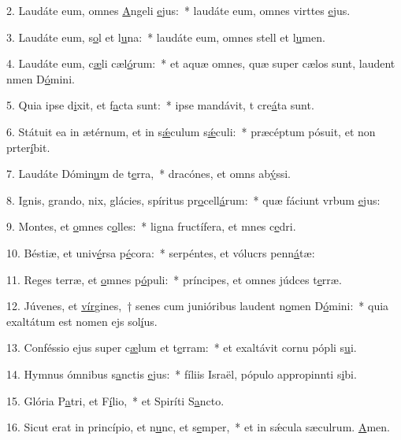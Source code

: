 2. Laudáte eum, omnes \uline{A}ngeli \uline{e}jus:~* laudáte eum, omnes virttes \uline{e}jus.\par 
3. Laudáte eum, s\uline{o}l et l\uline{u}na:~* laudáte eum, omnes stell et l\uline{u}men.\par 
4. Laudáte eum, c\uline{æ}li cæl\uline{ó}rum:~* et aquæ omnes, quæ super cælos sunt, laudent nmen D\uline{ó}mini.\par 
5. Quia ipse d\uline{i}xit, et f\uline{a}cta sunt:~* ipse mandávit, t cre\uline{á}ta sunt.\par 
6. Státuit ea in ætérnum, et in s\uline{ǽ}culum s\uline{ǽ}culi:~* præcéptum pósuit, et non prter\uline{í}bit.\par 
7. Laudáte Dómin\uline{u}m de t\uline{e}rra,~* dracónes, et omns ab\uline{ý}ssi.\par 
8. Ignis, grando, nix, glácies, spíritus pr\uline{o}cell\uline{á}rum:~* quæ fáciunt vrbum \uline{e}jus:\par 
9. Montes, et \uline{o}mnes c\uline{o}lles:~* ligna fructífera, et mnes c\uline{e}dri.\par 
10. Béstiæ, et univ\uline{é}rsa p\uline{é}cora:~* serpéntes, et vólucrs penn\uline{á}tæ:\par 
11. Reges terræ, et \uline{o}mnes p\uline{ó}puli:~* príncipes, et omnes júdces t\uline{e}rræ.\par 
12. Júvenes, et \uline{vír}gines,~† senes cum junióribus laudent n\uline{o}men D\uline{ó}mini:~* quia exaltátum est nomen ejs sol\uline{í}us.\par 
13. Conféssio ejus super c\uline{æ}lum et t\uline{e}rram:~* et exaltávit cornu pópli s\uline{u}i.\par 
14. Hymnus ómnibus s\uline{a}nctis \uline{e}jus:~* fíliis Israël, pópulo appropinnti s\uline{i}bi.\par 
15. Glória P\uline{a}tri, et F\uline{í}lio,~* et Spiríti S\uline{a}ncto.\par 
16. Sicut erat in princípio, et n\uline{u}nc, et s\uline{e}mper,~* et in sǽcula sæculrum. \uline{A}men.\par 
